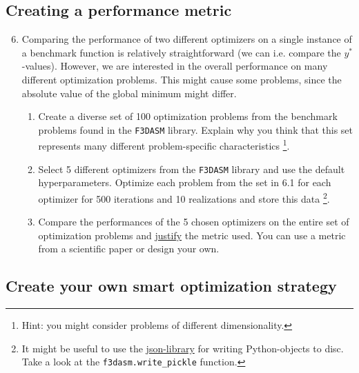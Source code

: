 \documentclass[10pt,a4paper,twoside]{article} %
\def\code#1{\texttt{#1}}
\begin{document}
\subsection*{Creating a performance metric}

\begin{enumerate}
    \setcounter{enumi}{5}
    \item Comparing the performance of two different optimizers on a single instance of a benchmark function is relatively straightforward (we can i.e. compare the $y^*$-values). However, we are interested in the overall performance on many different optimization problems. This might cause some problems, since the absolute value of the global minimum might differ.
    
    \begin{enumerate} [label*=\arabic*.]
        \item Create a diverse set of 100 optimization problems from the benchmark problems found in the \code{F3DASM} library. Explain why you think that this set represents many different problem-specific characteristics \footnote{Hint: you might consider problems of different dimensionality.}.
        
        \item Select 5 different optimizers from the \code{F3DASM} library and use the default hyperparameters. Optimize each problem from the set in 6.1 for each optimizer for 500 iterations and 10 realizations and store this data \footnote{It might be useful to use the \href{https://docs.python.org/3/library/json.html}{json-library} for writing Python-objects to disc. Take a look at the \code{f3dasm.write\_pickle} function.}.
        
        \item Compare the performances of the 5 chosen optimizers on the entire set of optimization problems and \underline{justify} the metric used. You can use a metric from a scientific paper or design your own.
        
    \end{enumerate}
    
\end{enumerate}

\subsection*{Create your own smart optimization strategy}
\end{document}
